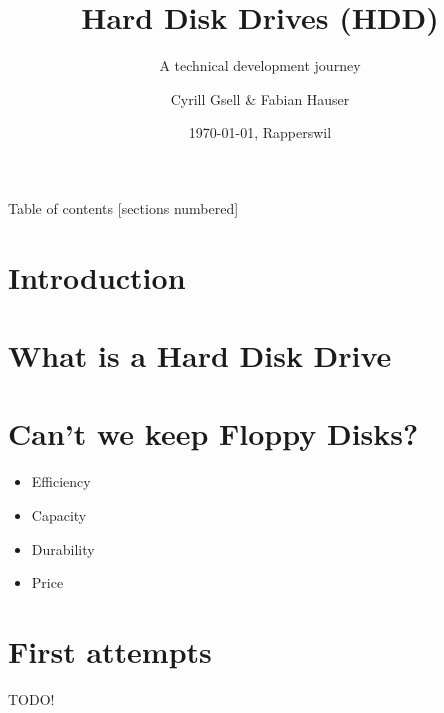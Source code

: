 \documentclass[10pt]{beamer}
\title{Hard Disk Drives (HDD)}
\subtitle{A technical development journey}
\date{\today, Rapperswil}
\author{Cyrill Gsell \& Fabian Hauser}
\institute{Computer Science (Sofware Engineering) \\
	TecBEC Presentation FS 2016}
\begin{document}
\maketitle

\begin{frame}{Table of contents}
  [sections numbered]
  \tableofcontents[hideallsubsections]
\end{frame}

\section{Introduction}
\section{What is a Hard Disk Drive}

\section{Can't we keep Floppy Disks?}
\begin{frame}
	\begin{itemize}
		\item Efficiency
		\item Capacity
		\item Durability
		\item Price
	\end{itemize}		
\end{frame}

\section{First attempts}
\begin{frame}
	TODO!	
\end{frame}
\end{document}
